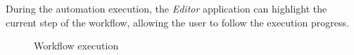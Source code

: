During the automation execution, the \textit{Editor} application can highlight the current step of the workflow, allowing the user to follow the execution progress.

\begin{figure}[h!]
    \begin{center}
    \end{center}
    \caption{Workflow execution} \label{fig:editor-run}
\end{figure}